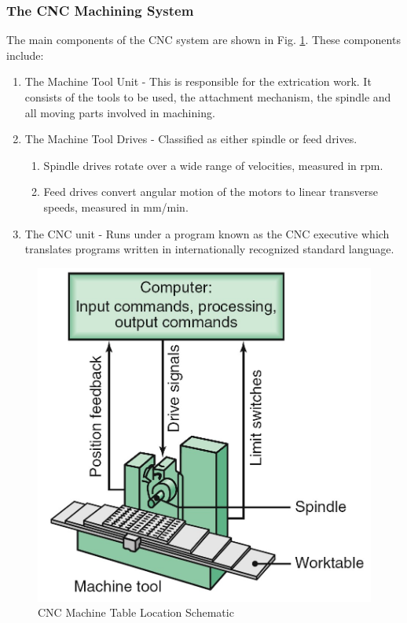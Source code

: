 \subsubsection{The CNC Machining System}
The main components of the CNC system are shown in Fig. \ref{fig:cnc}. These components include:
\begin{enumerate}
	\item The Machine Tool Unit - This is responsible for the extrication work. It consists of the tools to be used, the attachment mechanism, the spindle and all moving parts involved in machining.
	\item The Machine Tool Drives - Classified as either spindle or feed drives. \begin{enumerate}
		\item Spindle drives rotate over a wide range of velocities, measured in rpm.
		\item Feed drives convert angular motion of the motors to linear transverse speeds, measured in mm/min.
	\end{enumerate}
	\item The CNC unit - Runs under a program known as the CNC executive which translates programs written in internationally recognized standard language.
\end{enumerate}
\begin{figure}[h!]
	\centering
	\includegraphics[width=0.8\linewidth]{Figures/cncschematic}
	\caption[CNC Machining System Schematic]{CNC Machine Table Location Schematic}
	\label{fig:cnc}
\end{figure}
